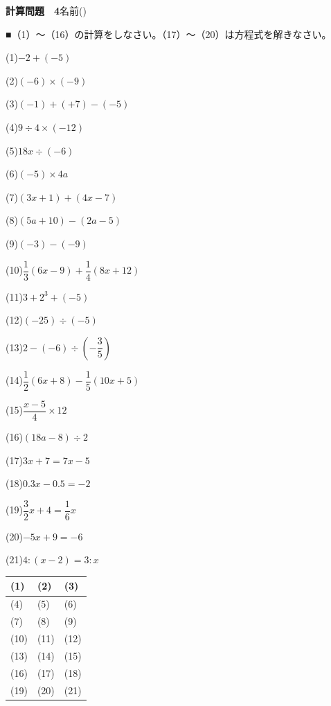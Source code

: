 \documentclass[a4paper,11pt]{ltjsarticle}
\newlength{\qcol}\setlength{\qcol}{0.47\textwidth}
\newlength{\qgap}
\newlength{\anscolw}\setlength{\anscolw}{0.30\textwidth}
\newlength{\ansh}
\newcommand{\Q}[2]{\parbox[t]{\qcol}{\raggedright (#1)\hspace{0.6em}$\displaystyle #2$}}
\newcommand{\QR}[4]{\Q{#1}{#2}\hfill\Q{#3}{#4}\par\vspace{\qgap}}
\newcommand{\anscell}[1]{\rule[-\ansdrop]{0pt}{\ansh}(#1)}
\newlength{\ansdrop}
\begin{document}
{\large\bfseries 計算問題　4}\hfill 名前(\underline{\hspace{32mm}})\par\vspace{3mm}
■（1）〜（16）の計算をしなさい。（17）〜（20）は方程式を解きなさい。\par\vspace{3mm}
\setlength{\qgap}{5.4mm}
\QR{1}{-2+(-5)}{2}{(-6)\times(-9)}
\QR{3}{(-1)+(+7)-(-5)}{4}{9\div4\times(-12)}
\QR{5}{18x\div(-6)}{6}{(-5)\times4a}
\QR{7}{(3x+1)+(4x-7)}{8}{(5a+10)-(2a-5)}
\QR{9}{(-3)-(-9)}{10}{\dfrac{1}{3}(6x-9)+\dfrac{1}{4}(8x+12)}
\QR{11}{3+2^3+(-5)}{12}{(-25)\div(-5)}
\QR{13}{2-(-6)\div\left(-\dfrac{3}{5}\right)}{14}{\dfrac{1}{2}(6x+8)-\dfrac{1}{5}(10x+5)}
\QR{15}{\dfrac{x-5}{4}\times12}{16}{(18a-8)\div2}
\QR{17}{3x+7=7x-5}{18}{0.3x-0.5=-2}
\QR{19}{\dfrac{3}{2}x+4=\dfrac{1}{6}x}{20}{-5x+9=-6}
\vspace{1mm}
\Q{21}{4:(x-2)=3:x}\par\vspace{3mm}
\setlength{\ansh}{9.5mm}\setlength{\ansdrop}{6mm}%
\begin{center}\begin{tabular}{|p{\anscolw}|p{\anscolw}|p{\anscolw}|}\hline
\anscell{1} & \anscell{2} & \anscell{3} \\\hline
\anscell{4} & \anscell{5} & \anscell{6} \\\hline
\anscell{7} & \anscell{8} & \anscell{9} \\\hline
\anscell{10} & \anscell{11} & \anscell{12} \\\hline
\anscell{13} & \anscell{14} & \anscell{15} \\\hline
\anscell{16} & \anscell{17} & \anscell{18} \\\hline
\anscell{19} & \anscell{20} & \anscell{21} \\\hline
\end{tabular}\end{center}
\end{document}

